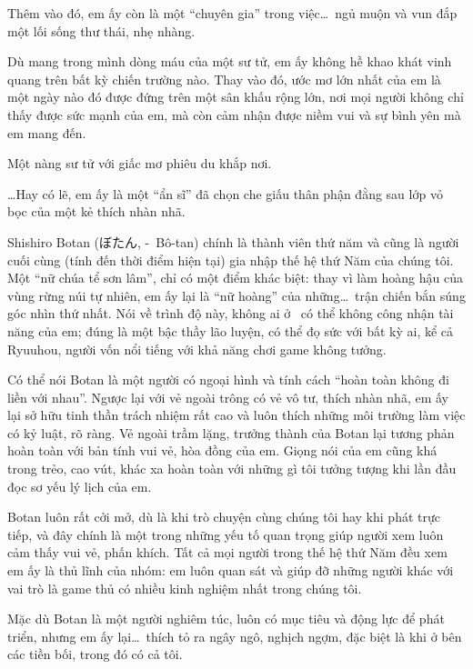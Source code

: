 \documentclass[../main.tex]{subfiles}
\begin{document}
Thêm vào đó, em ấy còn là một ``chuyên gia'' trong việc\dots\ ngủ muộn và vun đắp một lối sống thư thái, nhẹ nhàng.

Dù mang trong mình dòng máu của một sư tử, em ấy không hề khao khát vinh quang trên bất kỳ chiến trường nào. Thay vào đó, ước mơ lớn nhất của em là một ngày nào đó được đứng trên một sân khấu rộng lớn, nơi mọi người không chỉ thấy được sức mạnh của em, mà còn cảm nhận được niềm vui và sự bình yên mà em mang đến.

Một nàng sư tử với giấc mơ phiêu du khắp nơi.

\dots Hay có lẽ, em ấy là một ``ẩn sĩ'' đã chọn che giấu thân phận đằng sau lớp vỏ bọc của một kẻ thích nhàn nhã.

\chrint


Shishiro Botan (ぼたん, -\ Bô-tan) chính là thành viên thứ năm và cũng là người cuối cùng (tính đến thời điểm hiện tại) gia nhập thế hệ thứ Năm của chúng tôi. Một ``nữ chúa tể sơn lâm'', chỉ có một điểm khác biệt: thay vì làm hoàng hậu của vùng rừng núi tự nhiên, em ấy lại là ``nữ hoàng'' của những\dots\ trận chiến bắn súng góc nhìn thứ nhất. Nói về trình độ này, không ai ở \hll\ có thể không công nhận tài năng của em; đúng là một bậc thầy lão luyện, có thể đọ sức với bất kỳ ai, kể cả Ryuuhou, người vốn nổi tiếng với khả năng chơi game không tưởng.

Có thể nói Botan là một người có ngoại hình và tính cách ``hoàn toàn không đi liền với nhau''. Ngược lại với vẻ ngoài trông có vẻ vô tư, thích nhàn nhã, em ấy lại sở hữu tinh thần trách nhiệm rất cao và luôn thích những môi trường làm việc có kỷ luật, rõ ràng. Vẻ ngoài trầm lặng, trưởng thành của Botan lại tương phản hoàn toàn với bản tính vui vẻ, hòa đồng của em. Giọng nói của em cũng khá trong trẻo, cao vút, khác xa hoàn toàn với những gì tôi tưởng tượng khi lần đầu đọc sơ yếu lý lịch của em.

Botan luôn rất cởi mở, dù là khi trò chuyện cùng chúng tôi hay khi phát trực tiếp, và đây chính là một trong những yếu tố quan trọng giúp người xem luôn cảm thấy vui vẻ, phấn khích. Tất cả mọi người trong thế hệ thứ Năm đều xem em ấy là thủ lĩnh của nhóm: em luôn quan sát và giúp đỡ những người khác với vai trò là game thủ có nhiều kinh nghiệm nhất trong chúng tôi.

Mặc dù Botan là một người nghiêm túc, luôn có mục tiêu và động lực để phát triển, nhưng em ấy lại\dots\ thích tỏ ra ngây ngô, nghịch ngợm, đặc biệt là khi ở bên các tiền bối, trong đó có cả tôi.
\end{document}

